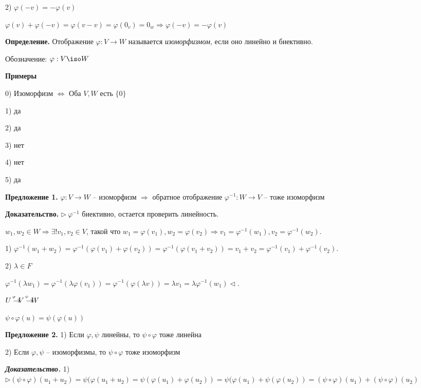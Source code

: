 2) $\varphi(-v) = -\varphi(v)$

$\varphi(v) + \varphi(-v) = \varphi(v - v) = \varphi(0_v) = 0_w \Rightarrow \varphi(-v) = -\varphi(v)$

\bigskip
\textbf{Определение.} Отображение $\varphi: V \rightarrow W$ называется \textit{изоморфизмом}, если оно линейно и биективно.

Обозначение: $\varphi: V \iso W$

\bigskip
\textbf{Примеры}

0) Изоморфизм $\Leftrightarrow$ Оба $V, W$ есть $\{0\}$

1) да

2) да

3) нет

4) нет

5) да

\bigskip
\textbf{Предложение 1.} $\varphi: V \rightarrow W$ -- изоморфизм $\Rightarrow$ обратное отображение $\varphi^{-1}: W \rightarrow V$ -- тоже изоморфизм

\bigskip
\textbf{Доказательство.} $\rhd \ \varphi^{-1}$ биективно, остается проверить линейность.

$w_1, w_2 \in W \Rightarrow \exists ! v_1, v_2 \in V$, такой что $w_1 = \varphi (v_1), w_2 = \varphi(v_2) \Rightarrow v_1 = \varphi^{-1} (w_1), v_2 = \varphi^{-1} (w_2)$.

1) $\varphi^{-1} (w_1 + w_2) = \varphi^{-1} (\varphi(v_1) + \varphi(v_2)) = \varphi^{-1}(\varphi(v_1 + v_2)) = v_1 + v_2 = \varphi^{-1} (v_1) + \varphi^{-1} (v_2)$.

2) $\lambda \in F$

$\varphi^{-1} (\lambda w_1) = \varphi^{-1}( \lambda \varphi(v_1)) = \varphi^{-1} (\varphi (\lambda v)) = \lambda v_1 = \lambda \varphi^{-1}(w_1) \lhd$.

\bigskip
$U \rightarrow^{\hspace{-4mm}^{\varphi}} V \rightarrow^{\hspace{-4mm}^{\psi}} W$ 

$\psi \circ \varphi(u)= \psi (\varphi (u))$ 

\bigskip
\textbf{Предложение 2.} 1) Если $\varphi, \psi$ линейны, то $\psi \circ \varphi$ тоже линейна

2) Если $\varphi, \psi$ -- изоморфизмы, то $\psi \circ \varphi$ тоже изоморфизм

\bigskip
\textbf{\textit{Доказательство.}} 1) $\rhd (\psi \circ \varphi) (u_1 + u_2) = \psi (\varphi(u_1 + u_2) = \psi(\varphi(u_1) + \varphi(u_2)) = \psi(\varphi(u_1) + \psi (\varphi(u_2)) = (\psi \circ \varphi) (u_1) + (\psi \circ \varphi) (u_2)$ 


